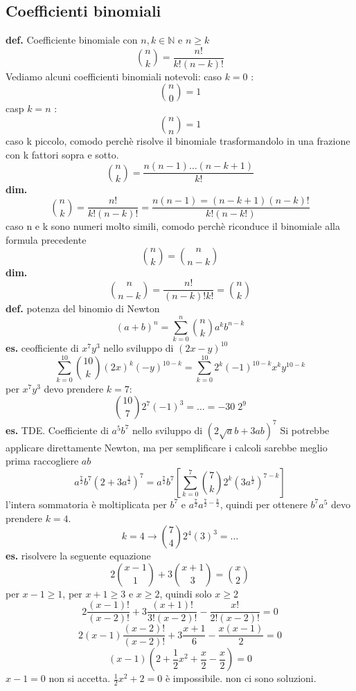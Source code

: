 \subsection*{Coefficienti binomiali}
\textbf{def.} Coefficiente binomiale con $n, k \in \mathbb{N}$ e $n \geq k$
\[
    \binom{n}{k} = \frac{n!}{k!(n-k)!}
\] 
Vediamo alcuni coefficienti binomiali notevoli:
\newline
caso $k = 0$ :
\[
    \binom{n}{0} = 1
\] 
\newline
\newline
casp $k=n$ :
\[
    \binom{n}{n} = 1
\]
\newline
\newline
caso k piccolo, comodo perchè risolve il binomiale trasformandolo in una frazione con k fattori sopra e sotto.
\[
    \binom{n}{k} = \frac{n(n-1)\dots(n-k+1)}{k!}  
\]
\newline
\textbf{dim.}
\[
    \binom{n}{k} = \frac{n!}{k!(n-k)!} = \frac{n(n-1) = (n-k+1) (n-k)!}{k!(n-k!)}
\]
\newline
\newline
caso n e k sono numeri molto simili, comodo perchè riconduce il binomiale alla formula precedente
\[
    \binom{n}{k} = \binom{n}{n-k}
\]
\textbf{dim.} 
\[
    \binom{n}{n-k} = \frac{n!}{(n-k)!k!} = \binom{n}{k}
\]
\newline
\textbf{def.} potenza del binomio di Newton
\[
    (a+b)^n = \sum_{k=0}^n \binom{n}{k} a^k b^{n-k}
\]
\newline
\textbf{es.} ceofficiente di $x^7y^3$ nello sviluppo di $(2x-y)^{10}$
\[
    \sum_{k=0}^{10} \binom{10}{k} (2x)^k (-y)^{10-k} = \sum_{k=0}^{10}2^k(-1)^{10-k}x^ky^{10-k}
\]
per $x^7y^3$ devo prendere $k=7$:
\[
    \binom{10}{7}2^7(-1)^3 = \dots = -30 \; 2^9
\]
\newline
\textbf{es.} TDE. Coefficiente di $a^5b^7$ nello sviluppo di $(2\sqrt{a}b+3ab)^7$
\newline
Si potrebbe applicare direttamente Newton, ma per semplificare i calcoli sarebbe meglio prima raccogliere $ab$
\[
    a^{\frac{7}{2}}b^7(2+3a^{\frac{1}{2}})^7 = a^{\frac{7}{2}}b^7 \left[ \sum_{k=0}^7\binom{7}{k}2^k(3a^{\frac{1}{2}})^{7-k} \right]
\]
l'intera sommatoria è moltiplicata per $b^7$ e $a^{\frac{7}{2}}a^{\frac{7}{2}-\frac{k}{2}}$, quindi per ottenere $b^7a^5$ devo prendere $k=4$.
\[
    k=4 \rightarrow \binom{7}{4}2^4(3)^3 = \dots
\]
\newline
\textbf{es.} risolvere la seguente equazione
\[
    2 \binom{x-1}{1}+3 \binom{x+1}{3} = \binom{x}{2}
\]
per $x-1 \geq 1$, per $x+1\geq3$ e $x\geq 2$, quindi solo $x\geq2$
\[
    2 \frac{(x-1)!}{(x-2)!} +3 \frac{(x+1)!}{3!(x-2)!} - \frac{x!}{2!(x-2)!} = 0
\]
\[
    2 (x-1) \frac{(x-2)!}{(x-2)!} + 3 \frac{x+1}{6}- \frac{x(x-1)}{2} = 0
\]
\[
    (x-1)(2+\frac{1}{2}x^2 + \frac{x}{2} -\frac{x}{2}) = 0
\]
$x-1 = 0$ non si accetta.
\newline
$\frac{1}{2}x^2 +2 = 0$ è impossibile.
\newline
non ci sono soluzioni.

